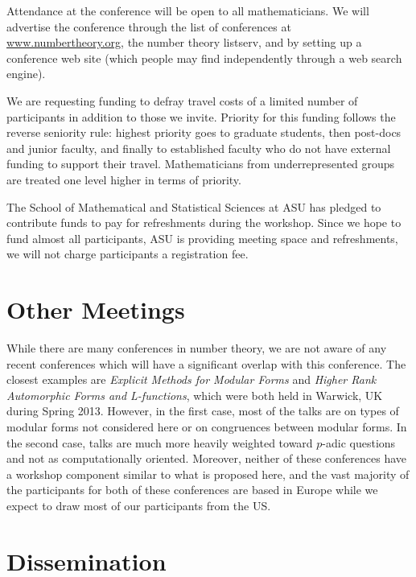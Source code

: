 \documentclass[12pt]{amsart}
\numberwithin{equation}{section}
\begin{document}
Attendance at the conference will be open to all mathematicians.  We
will advertise the conference through the list of conferences at
\url{www.numbertheory.org}, the number theory listserv, and by setting
up a conference web site (which people may find independently through
a web search engine).  

We are requesting funding to defray travel costs of a limited number
of participants in addition to those we invite.  Priority for
this funding follows the reverse seniority rule: highest priority goes
to graduate students, then post-docs and junior faculty, and finally
to established faculty who do not have external funding to support
their travel.  Mathematicians from underrepresented groups are treated
one level higher in terms of priority.


The School of Mathematical and Statistical Sciences at ASU has pledged to
contribute funds to pay for refreshments during the workshop.
Since we hope to fund almost all participants, ASU is providing
meeting space and refreshments, we will not charge participants a
registration fee.

\section{Other Meetings}

While there are many conferences in number theory, we are not aware of
any recent conferences which will have a significant overlap with this
conference.  The closest examples are {\em Explicit Methods for
  Modular Forms } and {\em Higher Rank Automorphic Forms and
  L-functions}, which were both held in Warwick, UK during Spring
2013.  However, in the first case, most of the talks are on types of
modular forms not considered here or on congruences between modular
forms.  In the second case, talks are much more heavily weighted
toward $p$-adic questions and not as computationally oriented.
Moreover, neither of these conferences have a workshop component
similar to what is proposed here, and the vast majority of the
participants for both of these conferences are based in Europe while
we expect to draw most of our participants from the US.



\section{Dissemination}
\end{document}
